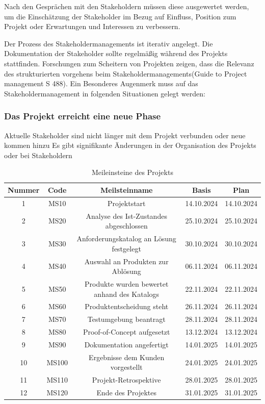\documentclass[12pt,oneside]{article}
\begin{document}
Nach den Gesprächen mit den Stakeholdern müssen diese ausgewertet werden, um die Einschätzung der Stakeholder im Bezug auf Einfluss,
Position zum Projekt oder Erwartungen und Interessen zu verbessern.


Der Prozess des Stakeholdermanagements ist iterativ angelegt. Die Dokumentation der Stakeholder sollte regelmäßig während
des Projekts stattfinden. Forschungen zum Scheitern von Projekten zeigen, dass die Relevanz des strukturierten vorgehens 
beim Stakeholdermanagements(Guide to Project management S 488).
Ein Besonderes Augenmerk muss auf das Stakeholdermanagement in folgenden Situationen gelegt werden:

\subsubsection{Das Projekt erreicht eine neue Phase}
Aktuelle Stakeholder sind nicht länger mit dem Projekt verbunden oder neue kommen hinzu
Es gibt signifikante Änderungen in der Organisation des Projekts oder bei Stakeholdern


\begin{table}[h]
  \centering
\begin{tabular}{|c|c|c|c|c|}
  \hline
  Nummer & Code & Meilsteinname & Basis & Plan \\
  \hline
  1 & MS10 & Projektstart & 14.10.2024 & 14.10.2024 \\
  \hline
  2 & MS20 & Analyse des Ist-Zustandes abgeschlossen & 25.10.2024 & 25.10.2024 \\
  \hline
  3 & MS30 & Anforderungskatalog an Lösung festgelegt & 30.10.2024 & 30.10.2024 \\
  \hline
  4 & MS40 & Auswahl an Produkten zur Ablösung & 06.11.2024 & 06.11.2024 \\
  \hline
  5 & MS50 & Produkte wurden bewertet anhand des Katalogs & 22.11.2024 & 22.11.2024 \\
  \hline
  6 & MS60 & Produktentscheidung steht & 26.11.2024 & 26.11.2024 \\
  \hline
  7 & MS70 & Testumgebung beantragt & 28.11.2024 & 28.11.2024 \\
  \hline
  8 & MS80 & Proof-of-Concept aufgesetzt & 13.12.2024 & 13.12.2024 \\
  \hline
  9 & MS90 & Dokumentation angefertigt & 14.01.2025 & 14.01.2025 \\
  \hline
  10 & MS100 & Ergebnisse dem Kunden vorgestellt & 24.01.2025 & 24.01.2025 \\
  \hline
  11 & MS110 & Projekt-Retrospektive & 28.01.2025 & 28.01.2025 \\
  \hline
  12 & MS120 & Ende des Projektes & 31.01.2025 & 31.01.2025 \\
  \hline
\end{tabular}

\caption{Meileinsteine des Projekts}
\label{tab:milestones}

\end{table}
\end{document}
